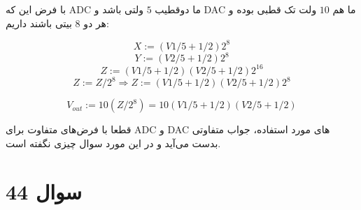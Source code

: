 \documentclass[12pt]{article}
\begin{document}
با فرض این که ADC ما دوقطیب $5$ ولتی باشد و DAC ما هم $10$ ولت تک قطبی بوده و هر دو $8$ بیتی باشند داریم:

$$X:= (V1/5 + 1/2)2^8$$
$$Y:= (V2/5 + 1/2)2^8$$
$$Z:= (V1/5 + 1/2)(V2/5 + 1/2)2^{16}$$
$$Z := Z/2^8 \Rightarrow Z:= (V1/5 + 1/2)(V2/5 + 1/2)2^{8}$$

$$V_{out}:= 10(Z/2^8) = 10(V1/5 + 1/2)(V2/5 + 1/2)$$


قطعا با فرض‌های متفاوت برای ADC و DAC های مورد استفاده، جواب متفاوتی بدست می‌آید و در این مورد سوال چیزی نگفته است.

\section*{سوال 44}

 
\end{document}
